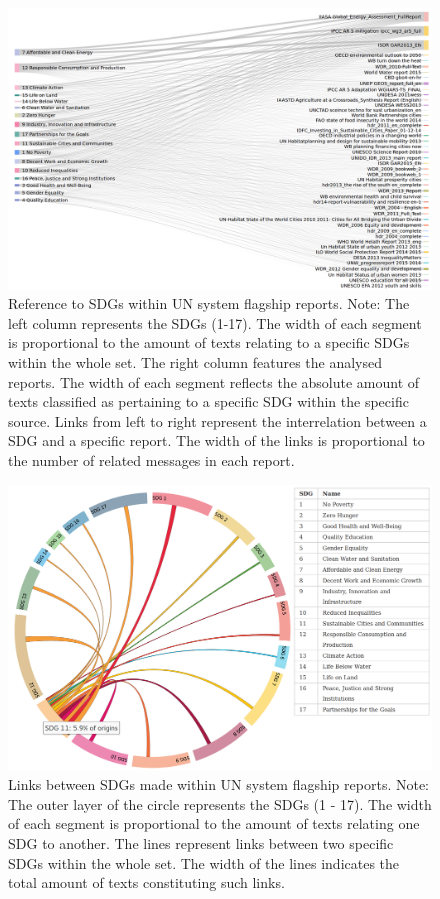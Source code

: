 \documentclass[]{article}
\begin{document}
\begin{figure}[H]	
	\centering
	\includegraphics[width=1\textwidth]{Reference_to_SDGs_within_UN_system_flagship_reports.png}
	\caption{Reference to SDGs within UN system flagship reports. Note: The left column represents the SDGs (1-17). The width of each segment is proportional to the amount of texts relating to a specific SDGs within the whole set. The right column features the analysed reports. The width of each segment reflects the absolute amount of texts classified as pertaining to a specific SDG within the specific source. Links from left to right represent the interrelation between a SDG and a specific report. The width of the links is proportional to the number of related messages in each report.}
\end{figure}
\begin{figure}[H]	
	\centering
	\includegraphics[width=1\textwidth]{Links_between_SDGs_made_within_UN_system_flagship_reports.png}
	\caption{Links between SDGs made within UN system flagship reports. Note: The outer layer of the circle represents the SDGs (1 - 17). The width of each segment is proportional to the amount of texts relating one SDG to another. The lines represent links between two specific SDGs within the whole set. The width of the lines indicates the total amount of texts constituting such links.}
\end{figure}
\end{document}
